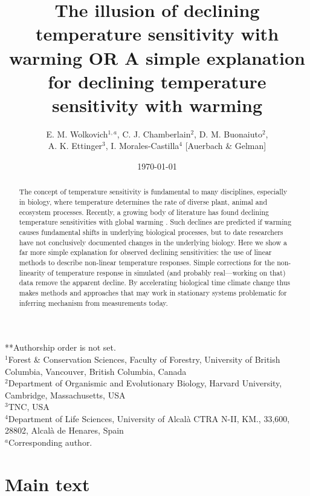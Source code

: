 \documentclass[11pt,letter]{article}
\begin{document}
\title{The illusion of declining temperature sensitivity with warming OR A simple explanation for declining temperature sensitivity with warming} %
\author{E. M. Wolkovich$^{1,a}$, C. J. Chamberlain$^{2}$, D. M. Buonaiuto$^{2}$, \\ A. K. Ettinger$^3$, I. Morales-Castilla$^{4}$ [Auerbach \& Gelman]} %

\date{\today} 
\maketitle
**Authorship order is not set.\\
$^1$Forest \& Conservation Sciences, Faculty of Forestry, University of British Columbia, Vancouver, British Columbia, Canada\\
$^2$Department of Organismic and Evolutionary Biology, Harvard University, Cambridge, Massachusetts, USA\\
$^3$TNC, USA\\
$^4$Department of Life Sciences, University of Alcal\`a CTRA N-II, KM., 33,600, 28802, Alcal\`a de Henares, Spain\\
$^a$Corresponding author.

\section{Main text}
\begin{abstract}
The concept of temperature sensitivity is fundamental to many disciplines, especially in biology, where temperature determines the rate of diverse plant, animal and ecosystem processes. Recently, a growing body of literature has found declining temperature sensitivities with global warming \citep{fu2015,gusewell2017,dai2019ag}. Such declines are predicted if warming causes fundamental shifts in underlying biological processes, but to date researchers have not conclusively documented changes in the underlying biology. Here we show a far more simple explanation for observed declining sensitivities: the use of linear methods to describe non-linear temperature responses. Simple corrections for the non-linearity of temperature response in simulated (and probably real---working on that) data remove the apparent decline. By accelerating biological time climate change thus makes methods and approaches that may work in stationary systems problematic for inferring mechanism from measurements today.
\end{abstract}
\end{document}
